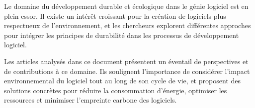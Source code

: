 Le domaine du développement durable et écologique dans le génie logiciel est en plein essor. Il existe un intérêt croissant pour la création de logiciels plus respectueux de l'environnement, et les chercheurs explorent différentes approches pour intégrer les principes de durabilité dans les processus de développement logiciel.

\singlespacing
\noindent Les articles analysés dans ce document présentent un éventail de perspectives et de contributions à ce domaine. Ils soulignent l'importance de considérer l'impact environnemental du logiciel tout au long de son cycle de vie, et proposent des solutions concrètes pour réduire la consommation d'énergie, optimiser les ressources et minimiser l'empreinte carbone des logiciels.